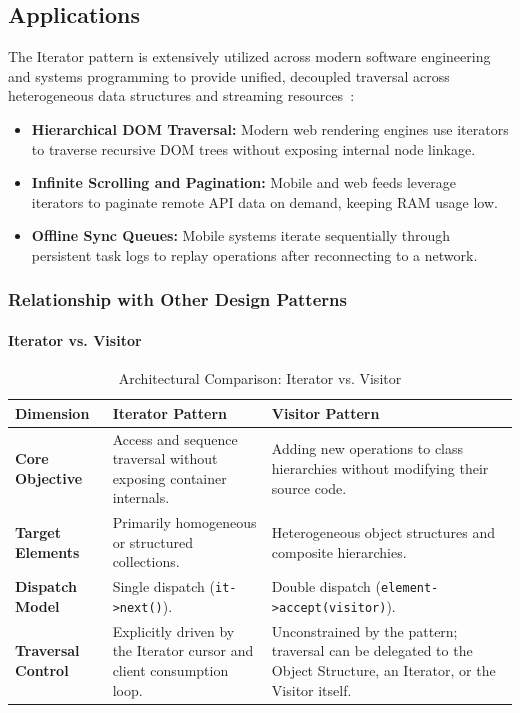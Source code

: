 \subsection{Applications}

The Iterator pattern is extensively utilized across modern software engineering and systems programming to provide unified, decoupled traversal across heterogeneous data structures and streaming resources~\cite{gof1994, refactoring_guru_iterator}:

\begin{itemize}
    \item \textbf{Hierarchical DOM Traversal:} Modern web rendering engines use iterators to traverse recursive DOM trees without exposing internal node linkage.
    \item \textbf{Infinite Scrolling and Pagination:} Mobile and web feeds leverage iterators to paginate remote API data on demand, keeping RAM usage low.
    \item \textbf{Offline Sync Queues:} Mobile systems iterate sequentially through persistent task logs to replay operations after reconnecting to a network.
\end{itemize}

\subsubsection{Relationship with Other Design Patterns}

\paragraph{Iterator vs. Visitor}
\begin{table}[htbp]
\centering
\caption{Architectural Comparison: Iterator vs. Visitor}
\label{tab:iterator_vs_visitor}
\begin{tabular}{@{}p{3.5cm} p{5.5cm} p{5.5cm}@{}}
\toprule
\textbf{Dimension} & \textbf{Iterator Pattern}~\cite{gof1994} & \textbf{Visitor Pattern}~\cite{gof1994} \\ \midrule
\textbf{Core Objective} & Access and sequence traversal without exposing container internals. & Adding new operations to class hierarchies without modifying their source code. \\ \midrule
\textbf{Target Elements} & Primarily homogeneous or structured collections. & Heterogeneous object structures and composite hierarchies. \\ \midrule
\textbf{Dispatch Model} & Single dispatch (\texttt{it->next()}). & Double dispatch (\texttt{element->accept(visitor)}). \\ \midrule
\textbf{Traversal Control} & Explicitly driven by the Iterator cursor and client consumption loop. & Unconstrained by the pattern; traversal can be delegated to the Object Structure, an Iterator, or the Visitor itself. \\ \bottomrule
\end{tabular}
\end{table}

